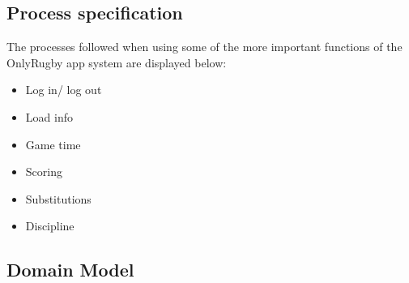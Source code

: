 \documentclass[a4paper,12pt]{report}
\begin{document}
\subsection{Process specification}
The processes followed when using some of the more important functions of the OnlyRugby app system are displayed below:
\begin{itemize}
	\item Log in/ log out
		\begin{center}
		\end{center}
	\item Load info
		\begin{center}
		\end{center}
	\item Game time
		\begin{center}
		\end{center}
	\item Scoring
		\begin{center}
		\end{center}
	\item Substitutions
		\begin{center}
		\end{center}
	\item Discipline
		\begin{center}
		\end{center}
\end{itemize}
\subsection{Domain Model}
	\begin{center}
	\end{center}
\newpage


{} 

\end{document}
